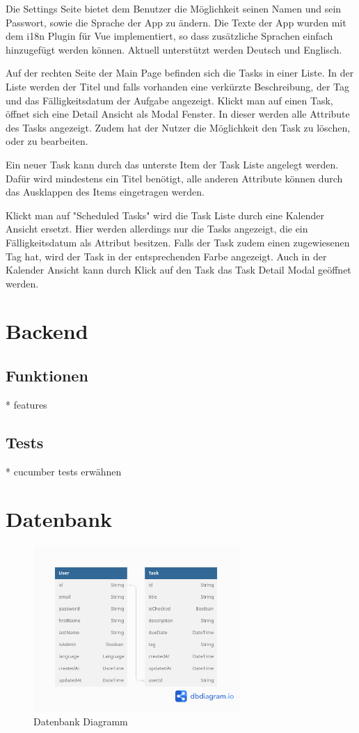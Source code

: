 \documentclass[a4paper, 12pt]{article}
\begin{document}
    Die Settings Seite bietet dem Benutzer die Möglichkeit seinen Namen und sein Passwort, sowie die Sprache der App zu ändern. Die Texte der App wurden mit dem i18n Plugin für Vue implementiert, so dass zusätzliche Sprachen einfach
    hinzugefügt werden können. Aktuell unterstützt werden Deutsch und Englisch.

    Auf der rechten Seite der Main Page befinden sich die Tasks in einer Liste. In der Liste werden der Titel und falls vorhanden eine verkürzte Beschreibung, der Tag und das Fälligkeitsdatum der Aufgabe angezeigt.
    Klickt man auf einen Task, öffnet sich eine Detail Ansicht als Modal Fenster. In dieser werden alle Attribute des Tasks angezeigt. Zudem hat der Nutzer die Möglichkeit den Task zu löschen, oder zu bearbeiten.

    Ein neuer Task kann durch das unterste Item der Task Liste angelegt werden. Dafür wird mindestens ein Titel benötigt, alle anderen Attribute können durch das Ausklappen des Items eingetragen werden.

    Klickt man auf "Scheduled Tasks" wird die Task Liste durch eine Kalender Ansicht ersetzt. Hier werden allerdings nur die Tasks angezeigt, die ein Fälligkeitsdatum als Attribut besitzen. Falls der Task zudem einen zugewiesenen Tag hat, wird der Task in der entsprechenden Farbe angezeigt.
    Auch in der Kalender Ansicht kann durch Klick auf den Task das Task Detail Modal geöffnet werden.


    \section{Backend}
    \subsection{Funktionen}
    * features

    \subsection{Tests}
    * cucumber tests erwähnen

    \section{Datenbank}
    \begin{figure}[H]
        \center\includegraphics[width=0.7\textwidth]{../images/database}
        \caption{Datenbank Diagramm}\label{fig:figure}
    \end{figure}
\end{document}
